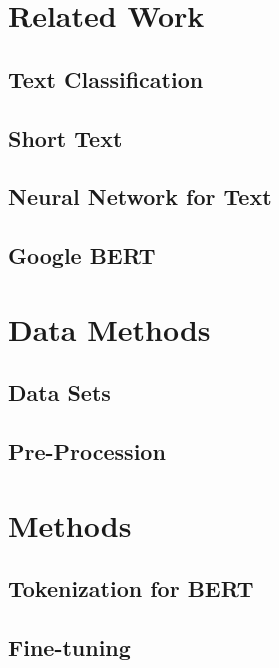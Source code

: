 \chapter{Related Work}\label{ch:rel}
\section{Text Classification}
\section{Short Text}
\section{Neural Network for Text}
\section{Google BERT}

\chapter{Data Methods}
\section{Data Sets}
\section{Pre-Procession}

\chapter{Methods}
\section{Tokenization for BERT}
\section{Fine-tuning}
